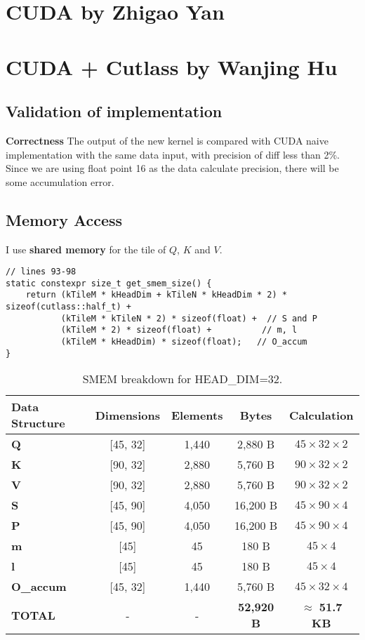 \documentclass[11pt]{article}
\begin{document}
\section{CUDA by Zhigao Yan}

\section{CUDA + Cutlass by Wanjing Hu}

\subsection{Validation of implementation}

\textbf{Correctness} The output of the new kernel is compared with CUDA naive implementation with the same data input, with precision of diff less than 2\%. Since we are using float point 16 as the data calculate precision, there will be some accumulation error.


\subsection{Memory Access}

I use \textbf{shared memory} for the tile of $Q$, $K$ and $V$.
\begin{lstlisting}
// lines 93-98
static constexpr size_t get_smem_size() {
    return (kTileM * kHeadDim + kTileN * kHeadDim * 2) * sizeof(cutlass::half_t) +
           (kTileM * kTileN * 2) * sizeof(float) +  // S and P
           (kTileM * 2) * sizeof(float) +          // m, l
           (kTileM * kHeadDim) * sizeof(float);   // O_accum
}
\end{lstlisting}

\begin{table}[h!]
\centering
\begin{tabular}{lcccc}
\toprule
\textbf{Data Structure} & \textbf{Dimensions} & \textbf{Elements} & \textbf{Bytes} & \textbf{Calculation} \\
\midrule
\textbf{Q} & [45, 32] & 1,440 & 2,880 B & $45 \times 32 \times 2$ \\
\textbf{K} & [90, 32] & 2,880 & 5,760 B & $90 \times 32 \times 2$ \\
\textbf{V} & [90, 32] & 2,880 & 5,760 B & $90 \times 32 \times 2$ \\
\textbf{S} & [45, 90] & 4,050 & 16,200 B & $45 \times 90 \times 4$ \\
\textbf{P} & [45, 90] & 4,050 & 16,200 B & $45 \times 90 \times 4$ \\
\textbf{m} & [45] & 45 & 180 B & $45 \times 4$ \\
\textbf{l} & [45] & 45 & 180 B & $45 \times 4$ \\
\textbf{O\_accum} & [45, 32] & 1,440 & 5,760 B & $45 \times 32 \times 4$ \\
\midrule
\textbf{TOTAL} & - & - & \textbf{52,920 B} & $\approx$ \textbf{51.7 KB} \\
\bottomrule
\end{tabular}
\caption{SMEM breakdown for HEAD\_DIM=32.}
\end{table}
\end{document}
